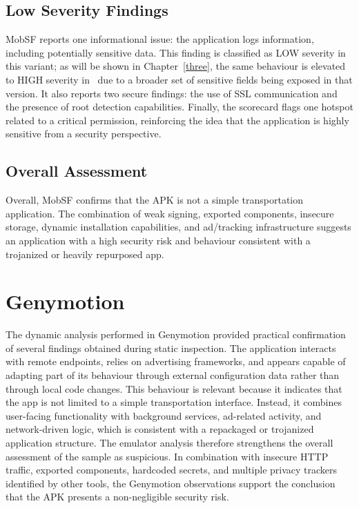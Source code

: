 \subsection{Low Severity Findings}
MobSF reports one informational issue: the application logs information, including potentially sensitive data. This finding is classified as LOW severity in this variant; as will be shown in Chapter~\ref{three}, the same behaviour is elevated to HIGH severity in \threer\ due to a broader set of sensitive fields being exposed in that version. It also reports two secure findings: the use of SSL communication and the presence of root detection capabilities. Finally, the scorecard flags one hotspot related to a critical permission, reinforcing the idea that the application is highly sensitive from a security perspective.

\subsection{Overall Assessment}
Overall, MobSF confirms that the APK is not a simple transportation application. The combination of weak signing, exported components, insecure storage, dynamic installation capabilities, and ad/tracking infrastructure suggests an application with a high security risk and behaviour consistent with a trojanized or heavily repurposed app.

\section{Genymotion}

The dynamic analysis performed in Genymotion provided practical confirmation of several findings obtained during static inspection. The application interacts with remote endpoints, relies on advertising frameworks, and appears capable of adapting part of its behaviour through external configuration data rather than through local code changes.
This behaviour is relevant because it indicates that the app is not limited to a simple transportation interface. Instead, it combines user-facing functionality with background services, ad-related activity, and network-driven logic, which is consistent with a repackaged or trojanized application structure.
The emulator analysis therefore strengthens the overall assessment of the sample as suspicious. In combination with insecure HTTP traffic, exported components, hardcoded secrets, and multiple privacy trackers identified by other tools, the Genymotion observations support the conclusion that the APK presents a non-negligible security risk.

